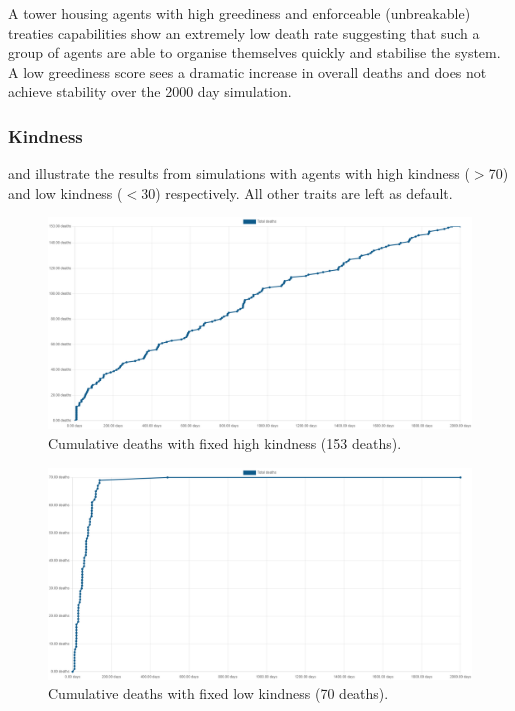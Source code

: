 A tower housing agents with high greediness and enforceable (unbreakable) treaties capabilities show an extremely low death rate suggesting that such a group of agents are able to organise themselves quickly and stabilise the system. A low greediness score sees a dramatic increase in overall deaths and does not achieve stability over the 2000 day simulation.

\subsubsection{Kindness}
\label{subsubsec: Kindness}
 and  illustrate the results from simulations with agents with high kindness ($>$70) and low kindness ($<$30) respectively. All other traits are left as default.

\begin{figure}[H]
    \begin{center}
        \includegraphics[scale=0.25]{009_team_7_agent_design/Images/Cumulative Deaths, fixed high kindness, T7Only, 2000days, 20food, 153deaths.png}
    \end{center}
    \caption{Cumulative deaths with fixed high kindness (153 deaths).}
    \label{fig: Fixed High Kindness}
\end{figure}

\begin{figure}[H]
    \begin{center}
        \includegraphics[scale=0.25]{009_team_7_agent_design/Images/Cumulative Deaths, fixed low kindness, T7Only, 2000days, 20food, 70deaths.png}
    \end{center}
    \caption{Cumulative deaths with fixed low kindness (70 deaths).}
    \label{fig: Fixed Low Kindness}
\end{figure}

